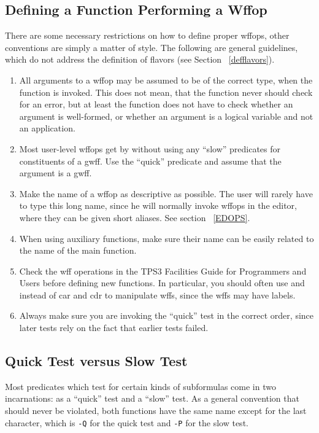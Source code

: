 \subsection{Defining a Function Performing a Wffop}
There are some necessary restrictions on how to define proper wffops,
other conventions are simply a matter of style.
The following are general guidelines,
which do not address the definition of flavors (see Section ~\ref{defflavors}).

\begin{enumerate}
\item All arguments to a wffop may be assumed to be of the correct type, when
the function is invoked.  This does not mean, that the function never
should check for an error, but at least the function does not have to check
whether an argument is well-formed, or whether an argument is a logical
variable and not an application.

\item Most user-level wffops get by without using any ``slow'' predicates for
constituents of a gwff.  Use the ``quick'' predicate and assume that
the argument is a gwff.

\item Make the name of a wffop as descriptive as possible.  The user will rarely
have to type this long name, since he will normally invoke wffops in the
editor, where they can be given short aliases.  See section ~\ref{EDOPS}.

\item When using auxiliary functions, make sure their name can be easily related
to the name of the main function.

\item Check the wff operations in the TPS3 Facilities Guide for Programmers and
Users before defining new functions. In particular, you should often use
 and  instead of car and cdr to 
manipulate wffs, since the wffs may have labels.

\item Always make sure you are invoking the ``quick'' test in the correct order,
since later tests rely on the fact that earlier tests failed.
\end{enumerate}

\subsection{Quick Test versus Slow Test}\label{quickslow}
Most predicates which test for certain kinds of subformulas come in two
incarnations: as a ``quick'' test and a ``slow'' test.  As a general
convention that should never be violated, both functions have the same
name except for the last character, which is {\tt -Q} for the quick
test and {\tt -P} for the slow test.

